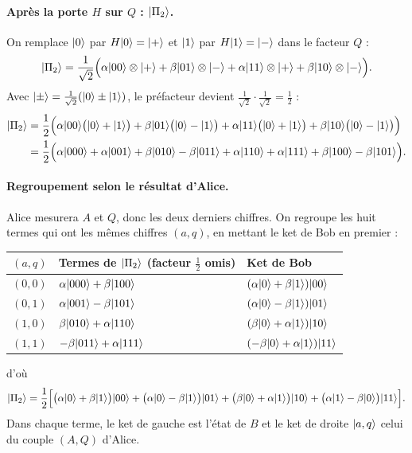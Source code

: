 \paragraph{Après la porte $H$ sur $Q$ : $|\Pi_2\rangle$.} On remplace $|0\rangle$ par
$H|0\rangle=|+\rangle$ et $|1\rangle$ par $H|1\rangle=|-\rangle$ dans le facteur $Q$ :
\[
  |\Pi_2\rangle=\frac{1}{\sqrt2}\Big(\alpha|00\rangle\otimes|+\rangle+\beta|01\rangle\otimes|-\rangle
    +\alpha|11\rangle\otimes|+\rangle+\beta|10\rangle\otimes|-\rangle\Big).
\]
Avec $|\pm\rangle=\frac{1}{\sqrt2}(|0\rangle\pm|1\rangle)$, le préfacteur devient
$\frac{1}{\sqrt2}\cdot\frac{1}{\sqrt2}=\frac12$ :
\begin{align*}
  |\Pi_2\rangle&=\frac12\Big(\alpha|00\rangle\big(|0\rangle+|1\rangle\big)+\beta|01\rangle\big(|0\rangle-|1\rangle\big)
     +\alpha|11\rangle\big(|0\rangle+|1\rangle\big)+\beta|10\rangle\big(|0\rangle-|1\rangle\big)\Big)\\
  &=\frac12\Big(\alpha|000\rangle+\alpha|001\rangle+\beta|010\rangle-\beta|011\rangle
     +\alpha|110\rangle+\alpha|111\rangle+\beta|100\rangle-\beta|101\rangle\Big).
\end{align*}

\paragraph{Regroupement selon le résultat d'Alice.} Alice mesurera $A$ et $Q$, donc les deux
derniers chiffres. On regroupe les huit termes qui ont les mêmes chiffres $(a,q)$, en mettant
le ket de Bob en premier :
\begin{center}
\renewcommand{\arraystretch}{1.3}
\begin{tabular}{@{}cll@{}}
\toprule
$(a,q)$ & Termes de $|\Pi_2\rangle$ (facteur $\frac12$ omis) & Ket de Bob \\
\midrule
$(0,0)$ & $\alpha|000\rangle+\beta|100\rangle$ & $(\alpha|0\rangle+\beta|1\rangle)|00\rangle$ \\
$(0,1)$ & $\alpha|001\rangle-\beta|101\rangle$ & $(\alpha|0\rangle-\beta|1\rangle)|01\rangle$ \\
$(1,0)$ & $\beta|010\rangle+\alpha|110\rangle$ & $(\beta|0\rangle+\alpha|1\rangle)|10\rangle$ \\
$(1,1)$ & $-\beta|011\rangle+\alpha|111\rangle$ & $(-\beta|0\rangle+\alpha|1\rangle)|11\rangle$ \\
\bottomrule
\end{tabular}
\end{center}
d'où
\[
  |\Pi_2\rangle=\frac12\Big[\big(\alpha|0\rangle+\beta|1\rangle\big)|00\rangle
    +\big(\alpha|0\rangle-\beta|1\rangle\big)|01\rangle
    +\big(\beta|0\rangle+\alpha|1\rangle\big)|10\rangle
    +\big(\alpha|1\rangle-\beta|0\rangle\big)|11\rangle\Big].
\]
Dans chaque terme, le ket de gauche est l'état de $B$ et le ket de droite $|a,q\rangle$ celui du
couple $(A,Q)$ d'Alice.

